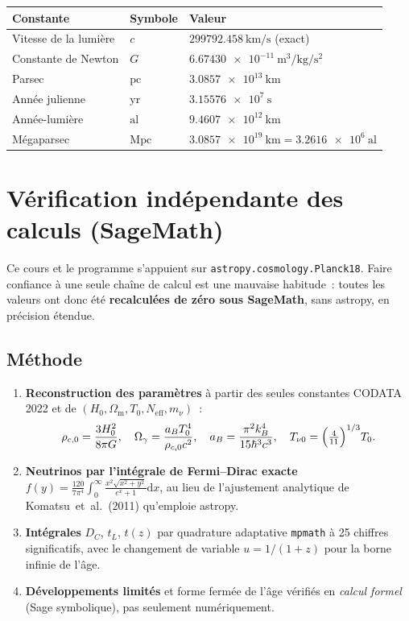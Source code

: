 \documentclass[11pt,a4paper,openany]{report}
\newcommand{\dif}{\mathrm{d}}
\newcommand{\Mpc}{\text{Mpc}}
\newcommand{\al}{\text{al}}
\newcommand{\Hzero}{H_{0}}
\newcommand{\Om}{\Omega_{\mathrm{m}}}
\begin{document}
\begin{center}
\renewcommand{\arraystretch}{1.3}
\begin{tabular}{lll}
\toprule
\textbf{Constante} & \textbf{Symbole} & \textbf{Valeur} \\
\midrule
Vitesse de la lumière & $c$ & $\SI{299792.458}{\km\per\second}$ (exact) \\
Constante de Newton & $G$ & $\SI{6.67430e-11}{\meter\cubed\per\kg\per\second\squared}$ \\
Parsec & $\text{pc}$ & $\SI{3.0857e13}{\km}$ \\
Année julienne & $\text{yr}$ & $\SI{3.15576e7}{\second}$ \\
Année-lumière & $\al$ & $\SI{9.4607e12}{\km}$ \\
Mégaparsec & $\Mpc$ & $\SI{3.0857e19}{\km} = \num{3.2616e6}~\al$ \\
\bottomrule
\end{tabular}
\end{center}

\chapter{Vérification indépendante des calculs (SageMath)}
\label{chap:verif}

Ce cours et le programme s'appuient sur \texttt{astropy.cosmology.Planck18}.
Faire confiance à une seule chaîne de calcul est une mauvaise habitude~: toutes
les valeurs ont donc été \textbf{recalculées de zéro sous SageMath}, sans
astropy, en précision étendue.

\section{Méthode}

\begin{enumerate}[topsep=3pt]
\item \textbf{Reconstruction des paramètres} à partir des seules constantes
CODATA 2022 et de $(\Hzero, \Om, T_{0}, N_{\text{eff}}, m_{\nu})$~:
\[
\rho_{c,0} = \frac{3\Hzero^{2}}{8\pi G},\quad
\Omega_{\gamma} = \frac{a_{B}T_{0}^{4}}{\rho_{c,0}c^{2}},\quad
a_{B} = \frac{\pi^{2}k_{B}^{4}}{15\hbar^{3}c^{3}},\quad
T_{\nu 0} = \Bigl(\tfrac{4}{11}\Bigr)^{1/3}T_{0}.
\]
\item \textbf{Neutrinos par l'intégrale de Fermi--Dirac exacte}
$f(y) = \frac{120}{7\pi^{4}}\int_{0}^{\infty}\frac{x^{2}\sqrt{x^{2}+y^{2}}}{e^{x}+1}\dif x$,
au lieu de l'ajustement analytique de Komatsu~et~al.~(2011) qu'emploie astropy.
\item \textbf{Intégrales} $D_{C}$, $t_{L}$, $t(z)$ par quadrature adaptative
\texttt{mpmath} à 25 chiffres significatifs, avec le changement de variable
$u = 1/(1+z)$ pour la borne infinie de l'âge.
\item \textbf{Développements limités} et forme fermée de l'âge vérifiés en
\emph{calcul formel} (Sage symbolique), pas seulement numériquement.
\end{enumerate}
\end{document}
